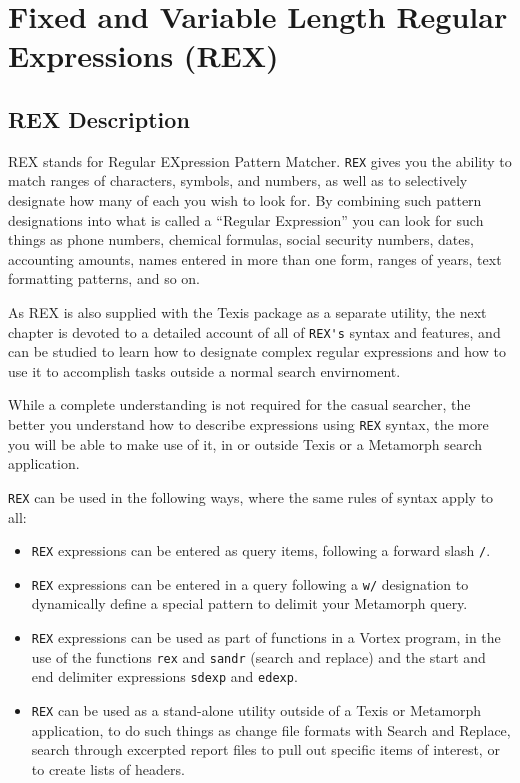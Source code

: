 \section{Fixed and Variable Length Regular Expressions (REX)}

\subsection{REX Description}

REX stands for Regular EXpression Pattern Matcher.  \verb`REX` gives
you the ability to match ranges of characters, symbols, and numbers,
as well as to selectively designate how many of each you wish to look
for.  By combining such pattern designations into what is called a
``Regular Expression'' you can look for such things as phone numbers,
chemical formulas, social security numbers, dates, accounting amounts,
names entered in more than one form, ranges of years, text formatting
patterns, and so on.

As REX is also supplied with the Texis package as a separate utility,
the next chapter is devoted to a detailed account of all of
\verb`REX's` syntax and features, and can be studied to learn how to
designate complex regular expressions and how to use it to accomplish
tasks outside a normal search envirnoment.

While a complete understanding is not required for the casual
searcher, the better you understand how to describe expressions using
\verb`REX` syntax, the more you will be able to make use of it,
in or outside Texis or a Metamorph search application.

\verb`REX` can be used in the following ways, where the same rules of
syntax apply to all:

\begin{itemize}

\item \verb`REX` expressions can be entered as query items,
following a forward slash \verb`/`.

\item \verb`REX` expressions can be entered in a query following a
\verb`w/` designation to dynamically define a special pattern to
delimit your Metamorph query.

\item \verb`REX` expressions can be used as part of functions in a
Vortex program, in the use of the functions \verb`rex` and
\verb`sandr` (search and replace) and the start and end delimiter
expressions \verb`sdexp` and \verb`edexp`.

\item \verb`REX` can be used as a stand-alone utility outside of a
Texis or Metamorph application, to do such things as change file
formats with Search and Replace, search through excerpted report files
to pull out specific items of interest, or to create lists of headers.

\end{itemize}

